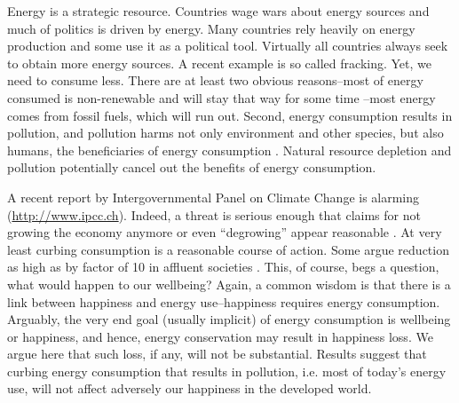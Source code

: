 \documentclass[10pt, letterpaper]{article}
\begin{document}
\begin{spacing}{1.0}

 Energy is a strategic
resource. Countries wage wars about energy sources  and much of politics is
driven by energy. %
Many  countries rely heavily on energy production
and some use it as a political tool. %
%
 Virtually all countries  always seek to obtain more energy sources. A recent example is so called
fracking. Yet, we need to consume less. There are at least two
obvious reasons--most of energy consumed  is non-renewable and will stay
that way for some time \citep{mackay08}--most energy comes from
fossil fuels, which will run out. %
Second, energy consumption results in pollution, and pollution harms not only
 environment and other species, but also  humans, the beneficiaries of energy
consumption \citep{mackerron09,gandelman12,ferreira13}. Natural resource
depletion and pollution potentially cancel out the benefits of energy
consumption. 
 
A recent report by
Intergovernmental Panel on Climate Change is alarming 
(\url{http://www.ipcc.ch}). %
Indeed, a threat is serious enough that
claims for not growing the economy anymore or even ``degrowing'' 
appear reasonable \citep{kallis11, kallis12}. %
At very
least curbing consumption is a reasonable course of action. Some argue reduction as high
as by factor of 10 in affluent societies \citep{pretty13}. This,
of course, begs a question, what would happen to our wellbeing?
 Again, a common %
wisdom is that there is a link between happiness and
energy use--happiness requires energy consumption.
Arguably, the very end goal (usually implicit)
of energy consumption is wellbeing or happiness, and hence,  %
%
 energy conservation may result in happiness loss.
 We argue here that such loss, if
any,  will
not be substantial. Results suggest that curbing energy consumption that results
in pollution, i.e. most of today's energy use, will not affect adversely our
happiness in the developed world.  %



\end{spacing}
\end{document}
